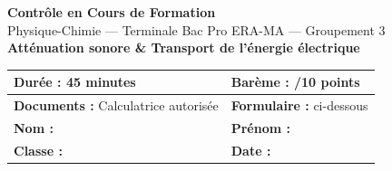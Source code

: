 \documentclass[a4paper,11pt]{article}
\begin{document}
\begin{center}
{\LARGE\bfseries\color{vertpro} Contrôle en Cours de Formation}\\[8pt]
{\large Physique-Chimie — Terminale Bac Pro ERA-MA — Groupement 3}\\[12pt]
{\Large\bfseries Atténuation sonore \& Transport de l'énergie électrique}\\[20pt]

\begin{tabular}{|p{6cm}|p{6cm}|}
\hline
\textbf{Durée :} 45 minutes & \textbf{Barème :} /10 points \\
\hline
\textbf{Documents :} Calculatrice autorisée & \textbf{Formulaire :} ci-dessous \\
\hline
\textbf{Nom :} \dotfill & \textbf{Prénom :} \dotfill \\
\hline
\textbf{Classe :} \dotfill & \textbf{Date :} \dotfill \\
\hline
\end{tabular}
\end{center}

\vspace{10pt}
\end{document}
